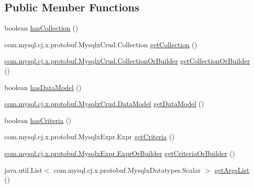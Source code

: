 \subsection*{Public Member Functions}
\begin{DoxyCompactItemize}
\item 
boolean \mbox{\hyperlink{interfacecom_1_1mysql_1_1cj_1_1x_1_1protobuf_1_1_mysqlx_crud_1_1_delete_or_builder_a9e8731cc1c267b848ff85e657a9361f1}{has\+Collection}} ()
\item 
com.\+mysql.\+cj.\+x.\+protobuf.\+Mysqlx\+Crud.\+Collection \mbox{\hyperlink{interfacecom_1_1mysql_1_1cj_1_1x_1_1protobuf_1_1_mysqlx_crud_1_1_delete_or_builder_a2406b7a1effbf6a026aa5a8ec392bead}{get\+Collection}} ()
\item 
\mbox{\hyperlink{interfacecom_1_1mysql_1_1cj_1_1x_1_1protobuf_1_1_mysqlx_crud_1_1_collection_or_builder}{com.\+mysql.\+cj.\+x.\+protobuf.\+Mysqlx\+Crud.\+Collection\+Or\+Builder}} \mbox{\hyperlink{interfacecom_1_1mysql_1_1cj_1_1x_1_1protobuf_1_1_mysqlx_crud_1_1_delete_or_builder_a3a432349b322409e842250aff44e2d2b}{get\+Collection\+Or\+Builder}} ()
\item 
boolean \mbox{\hyperlink{interfacecom_1_1mysql_1_1cj_1_1x_1_1protobuf_1_1_mysqlx_crud_1_1_delete_or_builder_ad5b041779e23600924c5974a7dfa662c}{has\+Data\+Model}} ()
\item 
\mbox{\hyperlink{enumcom_1_1mysql_1_1cj_1_1x_1_1protobuf_1_1_mysqlx_crud_1_1_data_model}{com.\+mysql.\+cj.\+x.\+protobuf.\+Mysqlx\+Crud.\+Data\+Model}} \mbox{\hyperlink{interfacecom_1_1mysql_1_1cj_1_1x_1_1protobuf_1_1_mysqlx_crud_1_1_delete_or_builder_a9f1c59b1b3c0442833dec8005ead1f10}{get\+Data\+Model}} ()
\item 
boolean \mbox{\hyperlink{interfacecom_1_1mysql_1_1cj_1_1x_1_1protobuf_1_1_mysqlx_crud_1_1_delete_or_builder_ab8fad8a46b1f8bc41750e03efdbfb71d}{has\+Criteria}} ()
\item 
com.\+mysql.\+cj.\+x.\+protobuf.\+Mysqlx\+Expr.\+Expr \mbox{\hyperlink{interfacecom_1_1mysql_1_1cj_1_1x_1_1protobuf_1_1_mysqlx_crud_1_1_delete_or_builder_a46be8a836f75bf0e418745b49eff57fa}{get\+Criteria}} ()
\item 
\mbox{\hyperlink{interfacecom_1_1mysql_1_1cj_1_1x_1_1protobuf_1_1_mysqlx_expr_1_1_expr_or_builder}{com.\+mysql.\+cj.\+x.\+protobuf.\+Mysqlx\+Expr.\+Expr\+Or\+Builder}} \mbox{\hyperlink{interfacecom_1_1mysql_1_1cj_1_1x_1_1protobuf_1_1_mysqlx_crud_1_1_delete_or_builder_abe24ec3741ad015b4e04f2a5f7bd5617}{get\+Criteria\+Or\+Builder}} ()
\item 
java.\+util.\+List$<$ com.\+mysql.\+cj.\+x.\+protobuf.\+Mysqlx\+Datatypes.\+Scalar $>$ \mbox{\hyperlink{interfacecom_1_1mysql_1_1cj_1_1x_1_1protobuf_1_1_mysqlx_crud_1_1_delete_or_builder_a6c949fa3a25b9ce2c0500e8571862d48}{get\+Args\+List}} ()

\end{DoxyCompactItemize}
